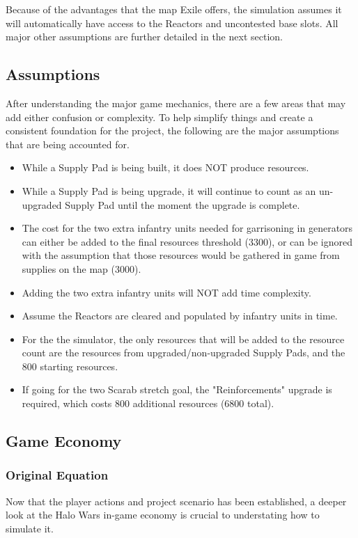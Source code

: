 \documentclass[a4paper, 12pt, english]{article}
\begin{document}
Because of the advantages that the map Exile offers, the simulation assumes it will automatically have access to the Reactors and uncontested base slots. All major other assumptions are further detailed in the next section.

\subsection{Assumptions}
After understanding the major game mechanics, there are a few areas that may add either confusion or complexity. To help simplify things and create a consistent foundation for the project, the following are the major assumptions that are being accounted for.
		\begin{itemize}
        \item While a Supply Pad is being built, it does NOT produce resources.
        \item While a Supply Pad is being upgrade, it will continue to count as an un-upgraded Supply Pad until the moment the upgrade is complete. 
        \item The cost for the two extra infantry units needed for garrisoning in generators can either be added to the final resources threshold (3300), or can be ignored with the assumption that those resources would be gathered in game from supplies on the map (3000).
        \item Adding the two extra infantry units will NOT add time complexity.
        \item Assume the Reactors are cleared and populated by infantry units in time.
        \item For the the simulator, the only resources that will be added to the resource count are the resources from upgraded/non-upgraded Supply Pads, and the 800 starting resources.
        \item If going for the two Scarab stretch goal, the "Reinforcements" upgrade is required, which costs 800 additional resources (6800 total).
  		\end{itemize}


\newpage
\subsection{Game Economy}
\subsubsection{Original Equation}
Now that the player actions and project scenario has been established, a deeper look at the Halo Wars in-game economy is crucial to understating how to simulate it. 
\newline
\end{document}
